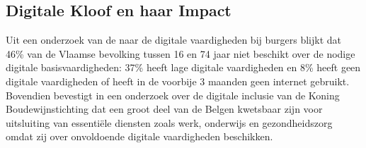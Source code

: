 




\subsection{Digitale Kloof en haar Impact}
Uit een onderzoek van de \textcite{VlaamseVeerkracht} naar de digitale vaardigheden bij burgers blijkt dat 46\% van de Vlaamse bevolking tussen 16 en 74 jaar niet beschikt over de nodige digitale basisvaardigheden: 37\% heeft lage digitale vaardigheden en 8\% heeft geen digitale vaardigheden of heeft in de voorbije 3 maanden geen internet gebruikt.
Bovendien bevestigt \textcite{DigitaleInclusieBarometer} in een onderzoek over de digitale inclusie van de Koning Boudewijnstichting dat een groot deel van de Belgen kwetsbaar zijn voor uitsluiting van essentiële diensten zoals werk, onderwijs en gezondheidszorg omdat zij over onvoldoende digitale vaardigheden beschikken.

